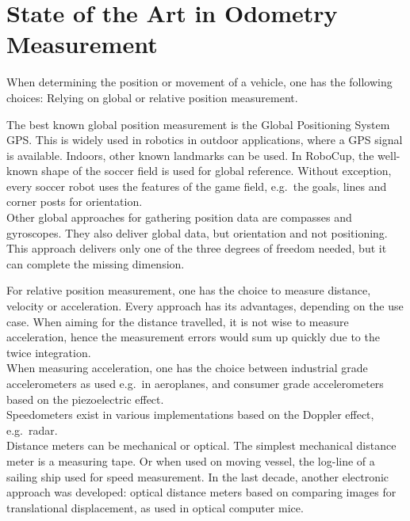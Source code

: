 \documentclass[12pt,a4paper]{article}
\begin{document}
\clearpage
\section{State of the Art in Odometry Measurement}

When determining the position or movement of a vehicle, one has the following choices: 
Relying on global or relative position measurement.

The best known global position measurement is the Global Positioning System GPS.
This is widely used in robotics in outdoor applications, where a GPS signal is available.
Indoors, other known landmarks can be used.
In RoboCup, the well-known shape of the soccer field is used for global reference.
Without exception, every soccer robot uses the features of the game field, e.g.\ the goals, lines and corner posts for orientation.\\
Other global approaches for gathering position data are compasses and gyroscopes.
They also deliver global data, but orientation and not positioning. 
This approach delivers only one of the three degrees of freedom needed, but it can complete the missing dimension.


For relative position measurement, one has the choice to measure distance, velocity or acceleration.
Every approach has its advantages, depending on the use case.
When aiming for the distance travelled, it is not wise to measure acceleration, hence the measurement errors would sum up quickly due to the twice integration.\\
When measuring acceleration, one has the choice between industrial grade accelerometers as used e.g.\ in aeroplanes, and consumer grade accelerometers based on the piezoelectric effect.\\
Speedometers exist in various implementations based on the Doppler effect, e.g.\ radar.\\
Distance meters can be mechanical or optical.
The simplest mechanical distance meter is a measuring tape.
Or when used on moving vessel, the log-line of a sailing ship used for speed measurement.
In the last decade, another electronic approach was developed: optical distance meters based on comparing images for translational displacement, as used in optical computer mice.

\end{document}
